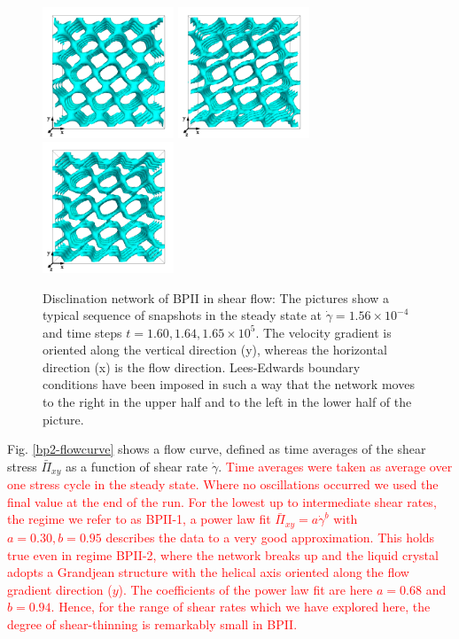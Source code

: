 \documentclass[8.5pt,twoside,twocolumn]{article}
\newcommand{\e}[1]{\times10^{#1}}
\newcommand{\gd}{\dot{\gamma}}
\newcommand{\rev}[1]{{\textcolor{red}{#1}}}
\begin{document}
\begin{figure}[htpb]
\center
\includegraphics[width=0.35\textwidth]{disc-160k_run902r.png}
\includegraphics[width=0.35\textwidth]{disc-164k_run902r.png}
\includegraphics[width=0.35\textwidth]{disc-165k_run902r.png}
\caption{Disclination network of BPII in shear flow: 
The pictures show a typical sequence of snapshots in the steady state 
at $\gd=1.56\e{-4}$ and time steps $t=1.60, 1.64,1.65\e{5}$. The velocity 
gradient is oriented along the vertical direction (y), whereas the 
horizontal direction (x) is the flow direction. Lees-Edwards boundary 
conditions have been imposed in such a way that the network moves to the 
right in the upper half and to the left in the lower half of the picture.}
\label{bp2-1-disc}
\end{figure}

Fig. \ref{bp2-flowcurve} shows a flow curve, defined as time averages of 
the shear stress $\bar{\Pi}_{xy}$ as a function of shear rate $\gd$.
\rev{
Time averages were taken as average over one stress cycle in the steady state.
Where no oscillations occurred we used the final value at the end of the run.
For the lowest up to intermediate shear rates, the regime we refer to as BPII-1, a 
power law fit $\bar{\Pi}_{xy}=a \gd^b$ with $a=0.30, b=0.95$ describes 
the data to a very good approximation.
This holds true even in regime BPII-2, where the network breaks up and 
the liquid crystal adopts a Grandjean structure with the helical axis oriented along the
flow gradient direction ($y$). The coefficients of the power law fit are
here $a=0.68$ and $b=0.94$. Hence, for the range of shear rates which we have explored here, 
the degree of shear-thinning is remarkably small in BPII.
}
\end{document}

